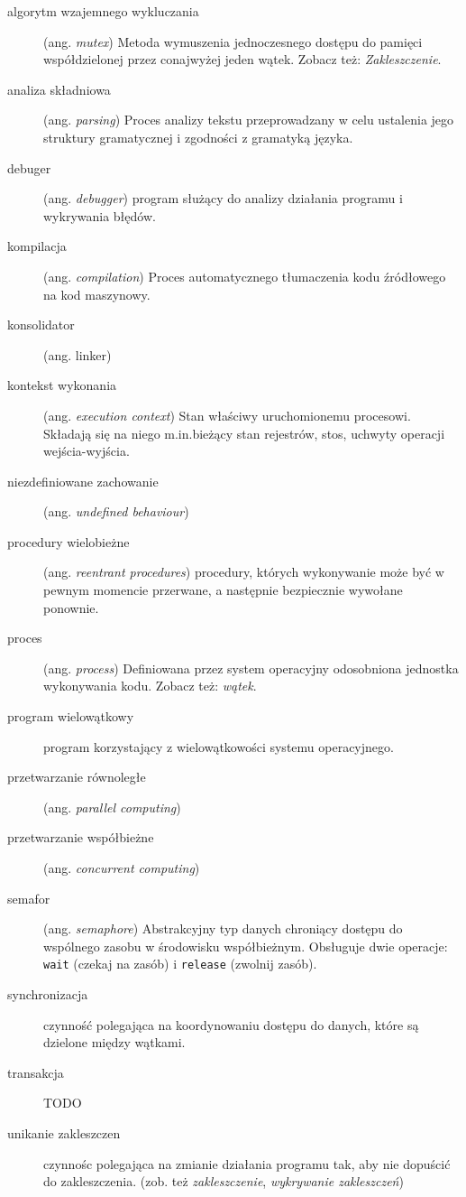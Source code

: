 \documentclass[12pt]{article}
\begin{document}
\begin{description}
    \item[algorytm wzajemnego wykluczania] (ang. \emph{mutex}) Metoda wymuszenia jednoczesnego dostępu do pamięci współdzielonej przez conajwyżej jeden wątek. Zobacz też: \emph{Zakleszczenie}.
    \item[analiza składniowa] (ang. \emph{parsing}) Proces analizy tekstu przeprowadzany w celu ustalenia jego struktury gramatycznej i zgodności z gramatyką języka.
    \item[debuger] (ang. \emph{debugger}) program służący do analizy działania programu i wykrywania błędów.
    \item[kompilacja] (ang. \emph{compilation}) Proces automatycznego tłumaczenia kodu źródłowego na kod maszynowy.
    \item[konsolidator] (ang. linker)
    \item[kontekst wykonania] (ang. \emph{execution context}) Stan właściwy uruchomionemu procesowi. Składają się na niego m.in.bieżący stan rejestrów, stos, uchwyty operacji wejścia-wyjścia.
    \item[niezdefiniowane zachowanie] (ang. \emph{undefined behaviour})
    \item[procedury wielobieżne] (ang. \emph{reentrant procedures}) procedury, których wykonywanie może być w pewnym momencie przerwane, a następnie bezpiecznie wywołane ponownie.
    \item[proces] (ang. \emph{process}) Definiowana przez system operacyjny odosobniona jednostka wykonywania kodu. Zobacz też: \emph{wątek}.
    \item[program wielowątkowy] program korzystający z wielowątkowości systemu operacyjnego.
    \item[przetwarzanie równoległe] (ang. \emph{parallel computing})
    \item[przetwarzanie współbieżne] (ang. \emph{concurrent computing})
    \item[semafor] (ang. \emph{semaphore}) Abstrakcyjny typ danych chroniący dostępu do wspólnego zasobu w środowisku współbieżnym. Obsługuje dwie operacje: \texttt{wait} (czekaj na zasób) i \texttt{release} (zwolnij zasób).
    \item[synchronizacja] czynność polegająca na koordynowaniu dostępu do danych, które są dzielone między wątkami.
    \item[transakcja] TODO
    \item[unikanie zakleszczen] czynnośc polegająca na zmianie działania programu tak, aby nie dopuścić do zakleszczenia. (zob. też \emph{zakleszczenie}, \emph{wykrywanie zakleszczeń})

\end{description}
\end{document}
